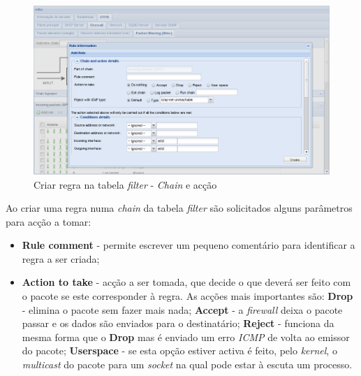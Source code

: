 \begin{figure}[H]
    \begin{center}
    \includegraphics[scale=0.38]{screenshots/etfw/etfw_firewall_02.png}
    \caption{Criar regra na tabela \textit{filter} - \textit{Chain} e acção}
    \label{fig:etfw_firewall_02}
    \end{center}
\end{figure}

Ao criar uma regra numa \textit{chain} da tabela \textit{filter} são solicitados alguns parâmetros para acção a tomar:

\begin{itemize}
    \item \textbf{Rule comment} - permite escrever um pequeno comentário para identificar a regra a ser criada;
    \item \textbf{Action to take} - acção a ser tomada, que decide o que deverá ser feito com o pacote se este corresponder à regra. As acções mais importantes são:
        \subitem \textbf{Drop} - elimina o pacote sem fazer mais nada;
        \subitem \textbf{Accept} - a \textit{firewall} deixa o pacote passar e os dados são enviados para o destinatário;
        \subitem \textbf{Reject} - funciona da mesma forma que o \textbf{Drop} mas é enviado um erro \textit{ICMP} de volta ao emissor do pacote;
        \subitem \textbf{Userspace} - se esta opção estiver activa é feito, pelo \textit{kernel}, o \textit{multicast} do pacote para um \textit{socket} na qual pode estar à escuta um processo.
\end{itemize}

